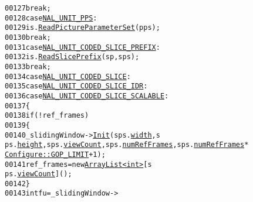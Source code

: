\begin{footnotesize}
\begin{alltt}
00127                                 \textcolor{keywordflow}{break};
00128                         \textcolor{keywordflow}{case} \hyperlink{_consts4_standard_8h_a0ae628337fb17a2b11855dd3524f3d04a0a937a1dcddd0ed49b7bbcc120a0a800}{NAL_UNIT_PPS}:
00129                                 is.\hyperlink{class_in_stream_a0f4a6aeef628f4ec90e8ff9ea2e8b566}{ReadPictureParameterSet}(pps);
00130                                 \textcolor{keywordflow}{break};
00131                         \textcolor{keywordflow}{case} \hyperlink{_consts4_standard_8h_a0ae628337fb17a2b11855dd3524f3d04a8c5dfdeb9a126add31b57b718eb32b46}{NAL_UNIT_CODED_SLICE_PREFIX}:
00132                                 is.\hyperlink{class_in_stream_ab40abe55d480a2dc42e484a8a7eb53a4}{ReadSlicePrefix}(sp, sps);
00133                                 \textcolor{keywordflow}{break};
00134                         \textcolor{keywordflow}{case} \hyperlink{_consts4_standard_8h_a0ae628337fb17a2b11855dd3524f3d04a59e9c5af2da46fe7a2d51fa43ab26127}{NAL_UNIT_CODED_SLICE}:
00135                         \textcolor{keywordflow}{case} \hyperlink{_consts4_standard_8h_a0ae628337fb17a2b11855dd3524f3d04aa641b2e28c7c244e45e28f99dfc63a54}{NAL_UNIT_CODED_SLICE_IDR}:
00136                         \textcolor{keywordflow}{case} \hyperlink{_consts4_standard_8h_a0ae628337fb17a2b11855dd3524f3d04a693f7e481367a7aad4420eb441703e8b}{NAL_UNIT_CODED_SLICE_SCALABLE}:
00137                                 \{
00138                                         \textcolor{keywordflow}{if} (!ref\_frames)
00139                                         \{
00140                                                 \_slidingWindow->\hyperlink{class_sliding_window_ac71c1ed41e1b33a1ef3623c881e6d9d7}{Init}(sps.\hyperlink{struct_sequence_parameters_set_a72286e512a40a01670e2519b3971cee2}{width}, s
      ps.\hyperlink{struct_sequence_parameters_set_ab3b7bd818f9a0d1456d92496473a42eb}{height}, sps.\hyperlink{struct_sequence_parameters_set_af32c7819f630856ccd99aaf78e8f656c}{viewCount}, sps.\hyperlink{struct_sequence_parameters_set_a8404973d25f8601dd012299638361f03}{numRefFrames}, sps.\hyperlink{struct_sequence_parameters_set_a8404973d25f8601dd012299638361f03}{numRefFrames} * 
      \hyperlink{class_configure_a0a595a8bf2825d2238fa77b2ecff2c5a}{Configure::GOP_LIMIT} + 1);
00141                                                 ref\_frames = \textcolor{keyword}{new} \hyperlink{class_array_list}{ArrayList<int>}[s
      ps.\hyperlink{struct_sequence_parameters_set_af32c7819f630856ccd99aaf78e8f656c}{viewCount}]();
00142                                         \}
00143                                         \textcolor{keywordtype}{int} fu = \_slidingWindow->

\end{alltt}
\end{footnotesize}
